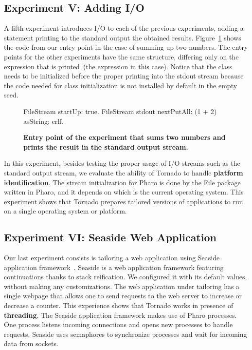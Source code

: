 \subsection*{Experiment V: Adding I/O} \label{sec:results_helloworld}

A fifth experiment introduces I/O to each of the previous experiments, adding a statement printing to the standard output the obtained results. Figure~\ref{fig:hello_world_entry_point} shows the code from our entry point in the case of summing up two numbers. The entry points for the other experiments have the same structure, differing only on the expression that is printed~(the  expression in this case). Notice that the  class needs to be initialized before the proper printing into the stdout stream because the code needed for class initialization is not installed by default in the empty seed.

\begin{figure}[ht]
\small
\begin{code}
FileStream startUp: true.
FileStream stdout 
	nextPutAll: (1 + 2) asString;
	crlf.
\end{code}
\caption{\small \textbf{Entry point of the experiment that sums two numbers and prints the result in the standard output stream.}\label{fig:hello_world_entry_point}}
\end{figure}

In this experiment, besides testing the proper usage of I/O streams such as the standard output stream, we evaluate the ability of Tornado to handle \textbf{platform identification}. The  stream initialization for Pharo is done by the File package written in Pharo, and it depends on which is the current operating system. This experiment shows that Tornado prepares tailored versions of applications to run on a single operating system or platform.

\subsection*{Experiment VI: Seaside Web Application}



Our last experiment consists is tailoring a web application using Seaside application framework~\cite{Duca07a}. Seaside is a web application framework featuring continuations thanks to stack reification. We configured it with its default values, without making any customizations. The web application under tailoring has a single webpage that allows one to send requests to the web server to increase or decrease a counter. This experience shows that Tornado works in presence of \textbf{threading}. The Seaside application framework makes use of Pharo processes. One process listens incoming connections and opens new processes to handle requests. Seaside uses semaphores to synchronize processes and wait for incoming data from sockets.

